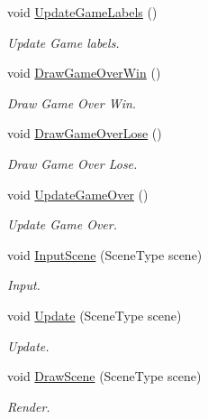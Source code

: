 \begin{DoxyCompactItemize}
void \hyperlink{class_scene_ac6eb6c5125587a6892014c9f780e3c4e}{Update\+Game\+Labels} ()
\begin{DoxyCompactList}\small\item\em Update Game labels. \end{DoxyCompactList}\item 
\mbox{\label{class_scene_ad3f5f2c640883175892a7a5de83bfce6}} 
void \hyperlink{class_scene_ad3f5f2c640883175892a7a5de83bfce6}{Draw\+Game\+Over\+Win} ()
\begin{DoxyCompactList}\small\item\em Draw Game Over Win. \end{DoxyCompactList}\item 
\mbox{\label{class_scene_a55a60bb3bef24f519fa4e3fb763d5b4f}} 
void \hyperlink{class_scene_a55a60bb3bef24f519fa4e3fb763d5b4f}{Draw\+Game\+Over\+Lose} ()
\begin{DoxyCompactList}\small\item\em Draw Game Over Lose. \end{DoxyCompactList}\item 
\mbox{\label{class_scene_a97e5de0ca09046583ea6f7732fb8c8cb}} 
void \hyperlink{class_scene_a97e5de0ca09046583ea6f7732fb8c8cb}{Update\+Game\+Over} ()
\begin{DoxyCompactList}\small\item\em Update Game Over. \end{DoxyCompactList}\item 
\mbox{\label{class_scene_ae04d616af3648d27068a24ce174a0eb5}} 
void \hyperlink{class_scene_ae04d616af3648d27068a24ce174a0eb5}{Input\+Scene} (Scene\+Type scene)
\begin{DoxyCompactList}\small\item\em Input. \end{DoxyCompactList}\item 
\mbox{\label{class_scene_a0b40f7844546047103c7b00066122f90}} 
void \hyperlink{class_scene_a0b40f7844546047103c7b00066122f90}{Update} (Scene\+Type scene)
\begin{DoxyCompactList}\small\item\em Update. \end{DoxyCompactList}\item 
\mbox{\label{class_scene_ab102b0a0b0b44de765e2d644051b01e9}} 
void \hyperlink{class_scene_ab102b0a0b0b44de765e2d644051b01e9}{Draw\+Scene} (Scene\+Type scene)
\begin{DoxyCompactList}\small\item\em Render. \end{DoxyCompactList}\end{DoxyCompactItemize}
